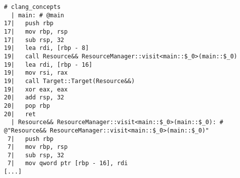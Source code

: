\begin{lstlisting}[language={},numbers=none,title=\href{https://godbolt.org/z/XYmsz5}{\texttt{godbolt.org/z/XYmsz5}}]
# clang_concepts 
  | main: # @main
17|   push rbp
17|   mov rbp, rsp
17|   sub rsp, 32
19|   lea rdi, [rbp - 8]
19|   call Resource&& ResourceManager::visit<main::$_0>(main::$_0)
19|   lea rdi, [rbp - 16]
19|   mov rsi, rax
19|   call Target::Target(Resource&&)
19|   xor eax, eax
20|   add rsp, 32
20|   pop rbp
20|   ret
  | Resource&& ResourceManager::visit<main::$_0>(main::$_0): # @"Resource&& ResourceManager::visit<main::$_0>(main::$_0)"
 7|   push rbp
 7|   mov rbp, rsp
 7|   sub rsp, 32
 7|   mov qword ptr [rbp - 16], rdi
[...]
\end{lstlisting}
